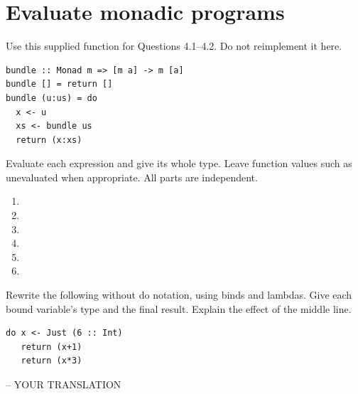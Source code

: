 \chapter{Evaluate monadic programs}
Use this supplied function for Questions 4.1--4.2. Do not reimplement it here.
\par\noindent\begin{minipage}{\linewidth}
\begin{lstlisting}
bundle :: Monad m => [m a] -> m [a]
bundle [] = return []
bundle (u:us) = do
  x <- u
  xs <- bundle us
  return (x:xs)
\end{lstlisting}
\end{minipage}\par

Evaluate each expression and give its whole type. Leave function values such as
 unevaluated when appropriate. All parts are independent.
\begin{enumerate}[label=(\alph*)]
\item {}
\item {}
\item {}
\item {}
\item {}
\item {}
\end{enumerate}

\clearpage
{}
Rewrite the following without do notation, using binds and lambdas. Give each
bound variable's type and the final result. Explain the effect of the middle line.
\par\noindent\begin{minipage}{\linewidth}
\begin{lstlisting}
do x <- Just (6 :: Int)
   return (x+1)
   return (x*3)
\end{lstlisting}
\end{minipage}\par
\par\noindent\begin{minipage}{\linewidth}
\begin{codeanswer}
-- YOUR TRANSLATION
\end{codeanswer}
\end{minipage}\par
{}

